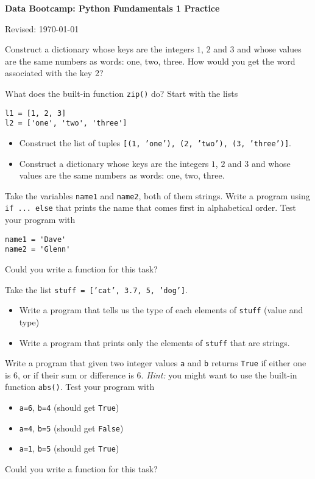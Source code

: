 \documentclass[11pt]{exam}
\begin{document}
\parindent=0.0in
\thispagestyle{empty}
%

\bigskip\bigskip
\centerline{\Large \bf Data Bootcamp:  Python Fundamentals 1 Practice}
\centerline{Revised: \today}

\medskip

\vspace{10mm}

\begin{questions}
\item Construct a dictionary whose keys are the integers $1$, $2$ and $3$ and whose values are the same numbers as words: one, two, three. How would you get the word associated with the key 2?  

\item What does the built-in function \texttt{zip()} do? Start with the lists
\begin{verbatim}
l1 = [1, 2, 3]
l2 = ['one', 'two', 'three']
\end{verbatim} 
\begin{itemize}
\item Construct the list of tuples \texttt{[(1, 'one'), (2, 'two'), (3, 'three')]}.
\item Construct a dictionary whose keys are the integers $1$, $2$ and $3$ and whose values are the same numbers as words: one, two, three.  
\end{itemize}

\item Take the variables \texttt{name1} and \texttt{name2}, both of them strings. Write a program using \texttt{if ... else} that prints the name that comes first in alphabetical order. Test your program with 
\begin{verbatim}
name1 = 'Dave'
name2 = 'Glenn'
\end{verbatim}
Could you write a function for this task?

\item Take the list \texttt{stuff = ['cat', 3.7, 5, 'dog']}. 
\begin{itemize}
\item Write a program that tells us the type of each elements of \texttt{stuff} (value and type)
\item Write a program that prints only the elements of \texttt{stuff} that are strings. 
\end{itemize}


\item Write a program that given two integer values \texttt{a} and \texttt{b} returns \texttt{True} if either one is $6$, or if their sum or difference is $6$. \emph{Hint:} you might want to use the built-in function \texttt{abs()}. Test your program with
\begin{itemize}
\item \texttt{a=6}, \texttt{b=4} (should get \texttt{True})
\item \texttt{a=4}, \texttt{b=5} (should get \texttt{False})
\item \texttt{a=1}, \texttt{b=5} (should get \texttt{True})
\end{itemize}
Could you write a function for this task?



\end{questions}
\end{document}
